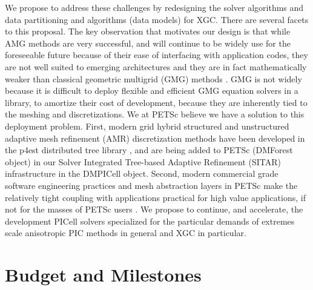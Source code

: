\documentclass[review]{siamart}
\begin{document}
We propose to address these challenges by redesigning the solver algorithms and data partitioning and algorithms (data models) for XGC.
There are several facets to this proposal.
The key observation that motivates our design is that while AMG methods are very successful, and will continue to be widely use for the foreseeable future because of their ease of interfacing with application codes, they are not well suited to emerging architectures and they are in fact mathematically weaker than classical geometric multigrid (GMG) methods \cite{Brandt-77}.
GMG is not widely because it is difficult to deploy flexible and efficient GMG equation solvers in a library, to amortize their cost of development, because they are inherently tied to the meshing and discretizations.
We at PETSc believe we have a solution to this deployment problem.
First, modern grid hybrid structured and unstructured adaptive mesh refinement (AMR) discretization methods have been developed in the p4est distributed tree library \cite{DBLP:journals/siamsc/IsaacBWG15,Rudi:2015:EIS:2807591.2807675,Stadler1033}, and are being added to PETSc (DMForest object) in our Solver Integrated Tree-based Adaptive Refinement (SITAR) infrastructure in the DMPICell object.
Second, modern commercial grade software engineering practices and mesh abstraction layers in PETSc make the relatively tight coupling with applications practical for high value applications, if not for the masses of PETSc users \cite{KnepleyBrownMcInnesSmithRuppAdams2015b}.
We propose to continue, and accelerate, the development PICell solvers specialized for the particular demands of extremes scale anisotropic PIC methods in general and XGC in particular.

\section{Budget and Milestones}
\label{sec:mile}
\end{document}
